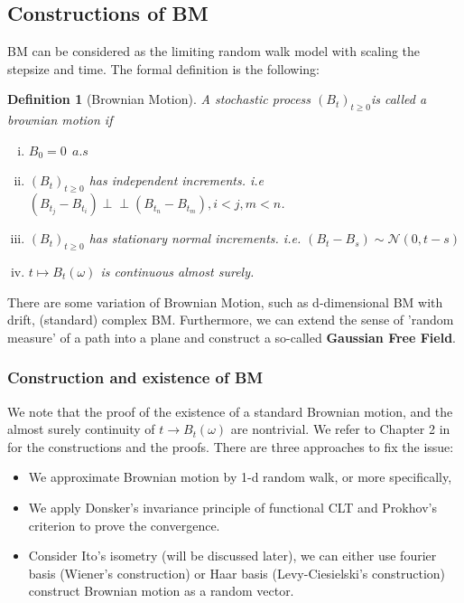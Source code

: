 \documentclass[11pt,english]{smfart}
\newtheorem{definition}[theorem]{Definition}
\begin{document}
\subsection{Constructions of BM} 
BM can be considered as the limiting random walk model with scaling the stepsize and time. The formal definition is the following:
~\\
\begin{definition}[Brownian Motion]
    A stochastic process $(B_t)_{t\ge 0}$is called a brownian motion if
    \begin{enumerate}[(i)]
        \item $B_0 = 0\ \ a.s$
        \item $(B_t)_{t\ge 0}$ has independent increments. i.e $(B_{t_j} - B_{t_i}) \perp\!\!\!\perp (B_{t_n} - B_{t_m}) , i < j, m<n$. 
        \item $(B_t)_{t\ge 0}$ has stationary normal increments. i.e. $(B_t - B_s) \sim \mathcal{N}(0,t-s)$
        \item $t\mapsto B_t(\omega)$ is continuous almost surely.
    \end{enumerate} 
\end{definition}

There are some variation of Brownian Motion, such as d-dimensional BM with drift, (standard) complex BM. Furthermore, we can extend the sense of 'random measure' of a path into a plane and construct a so-called \textbf{Gaussian Free Field}. \\


\subsubsection{Construction and existence of BM}
We note that the proof of the existence of a standard Brownian motion, and the almost surely continuity of $t\rightarrow B_t(\omega)$ are nontrivial. We refer to Chapter 2 in \cite{113} for the constructions and the proofs. There are three approaches to fix the issue:
\begin{itemize}
    \item We approximate Brownian motion by 1-d random walk, or more specifically,
    \item We apply Donsker's invariance principle of functional CLT and Prokhov's criterion to prove the convergence. 
    \item Consider Ito's isometry (will be discussed later), we can either use fourier basis (Wiener's construction) or Haar basis (Levy-Ciesielski's construction) construct Brownian motion as a random vector.
\end{itemize}
\end{document}
